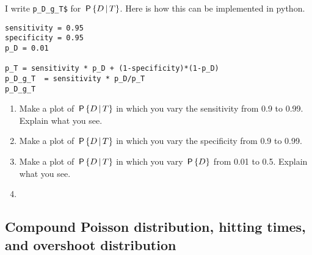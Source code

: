 \documentclass[assignments]{subfiles}
\begin{document}
I write \texttt{p\_D\_g\_T\$} for \(\P{D\given T}\). Here is how this can be implemented in python.

\begin{verbatim}
sensitivity = 0.95
specificity = 0.95
p_D = 0.01

p_T = sensitivity * p_D + (1-specificity)*(1-p_D)
p_D_g_T  = sensitivity * p_D/p_T
p_D_g_T
\end{verbatim}

\begin{enumerate}
\item Make a plot of \(\P{D\given T}\) in which you vary the sensitivity from 0.9 to 0.99. Explain what you see.
\item Make a plot of \(\P{D\given T}\) in which you vary the specificity from 0.9 to 0.99.
\item Make a plot of \(\P{D\given T}\) in which you vary \(\P{D}\) from 0.01 to 0.5. Explain what you see.
\item 
\end{enumerate}


\subsection{Compound Poisson distribution, hitting times, and overshoot distribution}
\label{sec:org0740c9c}
\end{document}
